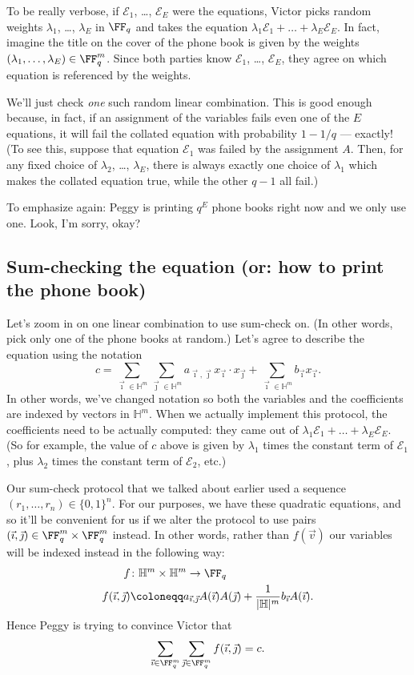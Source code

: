\documentclass[11pt]{scrreprt}
\newcommand{\HH}{\mathbb H}
\begin{document}
To be really verbose, if $\mathcal{E}_1$, \dots, $\mathcal{E}_E$ were the equations,
Victor picks random weights $\lambda_1$, \dots, $\lambda_E$ in $\FF_q$
and takes the equation $\lambda_1 \mathcal{E}_1 + \dots + \lambda_E \mathcal{E}_E$.
In fact, imagine the title on the cover of the phone book is
given by the weights $(\lambda_1, \dots, \lambda_E) \in \FF_q^m$.
Since both parties know $\mathcal E_1$, \dots, $\mathcal E_E$,
they agree on which equation is referenced by the weights.

We'll just check \emph{one} such random linear combination.
This is good enough because, in fact,
if an assignment of the variables fails even one of the $E$ equations,
it will fail the collated equation with probability $1 - 1/q$ --- exactly!
(To see this, suppose that equation $\mathcal E_1$ was failed by the assignment $A$.
Then, for any fixed choice of $\lambda_2$, \dots, $\lambda_E$, there is always
exactly one choice of $\lambda_1$ which makes the collated equation true,
while the other $q-1$ all fail.)

To emphasize again: Peggy is printing $q^E$ phone books right now and we only use one.
Look, I'm sorry, okay?

\subsection{Sum-checking the equation (or: how to print the phone book)}
Let's zoom in on one linear combination to use sum-check on.
(In other words, pick only one of the phone books at random.)
Let's agree to describe the equation using the notation
\[
  c = \sum_{\vec\imath \in \HH^m} \sum_{\vec\jmath \in \HH^m}
  a_{\vec\imath, \vec\jmath} x_{\vec\imath} \cdot x_{\vec\jmath}
  + \sum_{\vec\imath \in \HH^m} b_{\vec\imath} x_{\vec\imath}.
\]
In other words, we've changed notation so both the variables
and the coefficients are indexed by vectors in $\HH^m$.
When we actually implement this protocol, the coefficients need to be actually computed:
they came out of $\lambda_1 \mathcal{E}_1 + \dots + \lambda_E {\mathcal E}_E$.
(So for example, the value of $c$ above is given
by $\lambda_1$ times the constant term of $\mathcal E_1$,
plus $\lambda_2$ times the constant term of $\mathcal E_2$, etc.)

Our sum-check protocol that we talked about earlier
used a sequence $(r_1, \dots, r_n) \in \{0,1\}^n$.
For our purposes, we have these quadratic equations,
and so it'll be convenient for us if we alter the protocol to use pairs
$(\vec\imath, \vec\jmath) \in \FF_q^m \times \FF_q^m$ instead.
In other words, rather than $f(\vec v)$
our variables will be indexed instead in the following way:
\begin{align*}
  f &\colon \HH^m \times \HH^m \to \FF_q \\
  f(\vec\imath, \vec\jmath) &\coloneqq
    a_{\vec\imath, \vec\jmath} A(\vec\imath) A(\vec\jmath)
    + \frac{1}{|\HH|^m} b_{\vec\imath} A(\vec\imath).
\end{align*}
Hence Peggy is trying to convince Victor that
\[ \sum_{\vec\imath \in \FF_q^m}
  \sum_{\vec\jmath \in \FF_q^m} f(\vec\imath, \vec\jmath) = c. \]
\end{document}
